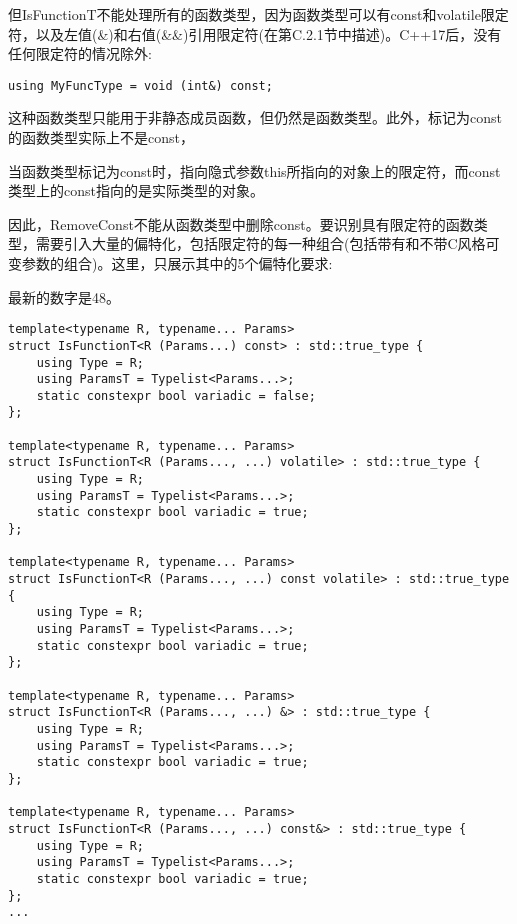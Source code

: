 但IsFunctionT不能处理所有的函数类型，因为函数类型可以有const和volatile限定符，以及左值(\&)和右值(\&\&)引用限定符(在第C.2.1节中描述)。C++17后，没有任何限定符的情况除外:

\begin{lstlisting}[style=styleCXX]
using MyFuncType = void (int&) const;
\end{lstlisting}

这种函数类型只能用于非静态成员函数，但仍然是函数类型。此外，标记为const的函数类型实际上不是const，

\begin{tcolorbox}[colback=webgreen!5!white,colframe=webgreen!75!black]
\hspace*{0.75cm}当函数类型标记为const时，指向隐式参数this所指向的对象上的限定符，而const类型上的const指向的是实际类型的对象。
\end{tcolorbox}

因此，RemoveConst不能从函数类型中删除const。要识别具有限定符的函数类型，需要引入大量的偏特化，包括限定符的每一种组合(包括带有和不带C风格可变参数的组合)。这里，只展示其中的5个偏特化要求:

\begin{tcolorbox}[colback=webgreen!5!white,colframe=webgreen!75!black]
\hspace*{0.75cm}最新的数字是48。
\end{tcolorbox}

\begin{lstlisting}[style=styleCXX]
template<typename R, typename... Params>
struct IsFunctionT<R (Params...) const> : std::true_type {
	using Type = R;
	using ParamsT = Typelist<Params...>;
	static constexpr bool variadic = false;
};

template<typename R, typename... Params>
struct IsFunctionT<R (Params..., ...) volatile> : std::true_type {
	using Type = R;
	using ParamsT = Typelist<Params...>;
	static constexpr bool variadic = true;
};

template<typename R, typename... Params>
struct IsFunctionT<R (Params..., ...) const volatile> : std::true_type {
	using Type = R;
	using ParamsT = Typelist<Params...>;
	static constexpr bool variadic = true;
};

template<typename R, typename... Params>
struct IsFunctionT<R (Params..., ...) &> : std::true_type {
	using Type = R;
	using ParamsT = Typelist<Params...>;
	static constexpr bool variadic = true;
};

template<typename R, typename... Params>
struct IsFunctionT<R (Params..., ...) const&> : std::true_type {
	using Type = R;
	using ParamsT = Typelist<Params...>;
	static constexpr bool variadic = true;
};
...
\end{lstlisting}

